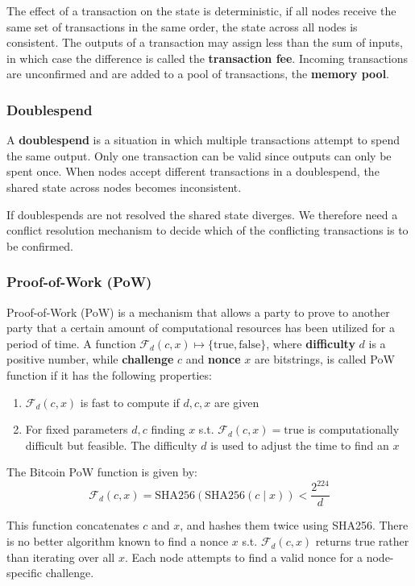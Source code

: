 The effect of a transaction on the state is deterministic, if all nodes receive the same set of transactions in the same order, the state across all nodes is consistent. The outputs of a transaction may assign less than the sum of inputs, in which case the difference is called the \textbf{transaction fee}. Incoming transactions are unconfirmed and are added to a pool of transactions, the \textbf{memory pool}.

\subsubsection{Doublespend}

A \textbf{doublespend} is a situation in which multiple transactions attempt to spend the same output. Only one transaction can be valid since outputs can only be spent once. When nodes accept different transactions in a doublespend, the shared state across nodes becomes inconsistent. \medskip

If doublespends are not resolved the shared state diverges. We therefore need a conflict resolution mechanism to decide which of the conflicting transactions is to be confirmed.

\subsubsection{Proof-of-Work (PoW)}

Proof-of-Work (PoW) is a mechanism that allows a party to prove to another party that a certain amount of computational resources has been utilized for a period of time. A function $\mathcal F_d(c,x) \mapsto \{\text{true}, \text{false}\}$, where \textbf{difficulty} $d$ is a positive number, while \textbf{challenge} $c$ and \textbf{nonce} $x$ are bitstrings, is called PoW function if it has the following properties:
\begin{enumerate}
	\item $\mathcal F_d(c,x)$ is fast to compute if $d,c,x$ are given
	\item For fixed parameters $d,c$ finding $x$ s.t. $\mathcal F_d(c,x) = \text{true}$ is computationally difficult but feasible. The difficulty $d$ is used to adjust the time to find an $x$
\end{enumerate}

The Bitcoin PoW function is given by:
$$\mathcal F_d(c,x) = \text{SHA}256(\text{SHA}256(c \; | \; x)) < \frac{2^{224}}{d}$$

This function concatenates $c$ and $x$, and hashes them twice using SHA256. There is no better algorithm known to find a nonce $x$ s.t. $\mathcal F_d(c,x)$ returns true rather than iterating over all $x$. Each node attempts to find a valid nonce for a node-specific challenge.

